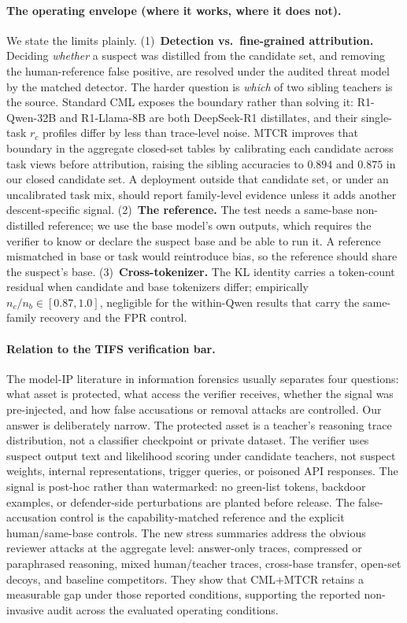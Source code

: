 \paragraph{The operating envelope (where it works, where it does not).}
We state the limits plainly. (1)~\textbf{Detection vs.\ fine-grained attribution.}
Deciding \emph{whether} a suspect was distilled from the candidate set, and removing
the human-reference false positive, are resolved under the audited threat model by
the matched detector. The harder
question is \emph{which} of two sibling teachers is the source. Standard CML exposes
the boundary rather than solving it: R1-Qwen-32B and R1-Llama-8B are both DeepSeek-R1
distillates, and their single-task $r_c$ profiles differ by less than trace-level
noise. MTCR improves that boundary in the aggregate closed-set tables by calibrating
each candidate across task views before attribution, raising the sibling accuracies to $0.894$ and $0.875$ in
our closed candidate set. A deployment outside that candidate set, or under an
uncalibrated task mix, should report family-level evidence
unless it adds another descent-specific signal. (2)~\textbf{The reference.} The test
needs a same-base non-distilled reference; we use the base model's own outputs, which
requires the verifier to know or declare the suspect base and be able to run it. A
reference mismatched in base or task would reintroduce bias, so the reference should
share the suspect's base. (3)~\textbf{Cross-tokenizer.} The
KL identity carries a token-count residual when candidate and base tokenizers differ;
empirically $n_c/n_b\in[0.87,1.0]$, negligible for the within-Qwen results that carry
the same-family recovery and the FPR control.

\paragraph{Relation to the TIFS verification bar.}
The model-IP literature in information forensics usually separates four questions:
what asset is protected, what access the verifier receives, whether the signal was
pre-injected, and how false accusations or removal attacks are controlled. Our
answer is deliberately narrow. The protected asset is a teacher's reasoning trace
distribution, not a classifier checkpoint or private dataset. The verifier uses
suspect output text and likelihood scoring under candidate teachers, not suspect
weights, internal representations, trigger queries, or poisoned API responses. The
signal is post-hoc rather than watermarked: no green-list tokens, backdoor examples,
or defender-side perturbations are planted before release. The false-accusation
control is the capability-matched reference and the explicit human/same-base
controls. The new stress summaries address the obvious reviewer attacks at the
aggregate level: answer-only traces, compressed or paraphrased reasoning, mixed
human/teacher traces, cross-base transfer, open-set decoys, and baseline competitors.
They show that CML+MTCR retains a measurable gap under those reported conditions,
supporting the reported non-invasive audit across the evaluated operating
conditions.

